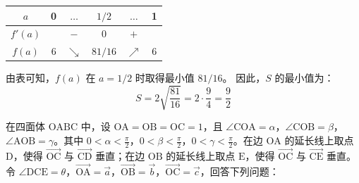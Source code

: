 \begin{questions}
\begin{parts}
\begin{solution}
        \begin{tabular}{|c|c|c|c|c|c|}
            \hline
            $a$ & 0 & $\dots$ & $1/2$ & $\dots$ & 1 \\
            \hline
            $f'(a)$ & & $-$ & 0 & $+$ & \\
            \hline
            $f(a)$ & 6 & $\searrow$ & $81/16$ & $\nearrow$ & 6 \\
            \hline
        \end{tabular}
        由表可知，$f(a)$ 在 $a = 1/2$ 时取得最小值 $81/16$。
        因此，$S$ 的最小值为：
        \[ S = 2\sqrt{\frac{81}{16}} = 2 \cdot \frac{9}{4} = \frac{9}{2} \text{} \]
    \end{solution}
\end{parts}

\question
在四面体 $\mathrm{OABC}$ 中，设 $\mathrm{OA} = \mathrm{OB} = \mathrm{OC} = 1$，且 $\angle\mathrm{COA} = \alpha$，$\angle\mathrm{COB} = \beta$，$\angle\mathrm{AOB} = \gamma$。其中 $0 < \alpha < \frac{\pi}{2}$，$0 < \beta < \frac{\pi}{2}$，$0 < \gamma < \frac{\pi}{2}$。在边 $\mathrm{OA}$ 的延长线上取点 $\mathrm{D}$，使得 $\vec{\mathrm{OC}}$ 与 $\vec{\mathrm{CD}}$ 垂直；在边 $\mathrm{OB}$ 的延长线上取点 $\mathrm{E}$，使得 $\vec{\mathrm{OC}}$ 与 $\vec{\mathrm{CE}}$ 垂直。令 $\angle\mathrm{DCE} = \theta$，$\vec{\mathrm{OA}} = \vec{a}$，$\vec{\mathrm{OB}} = \vec{b}$，$\vec{\mathrm{OC}} = \vec{c}$，回答下列问题：

\end{questions}
